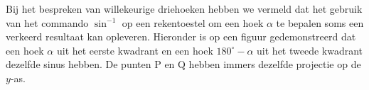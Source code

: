 %
%
%
%
\begin{opmerking}
	 Bij het bespreken van willekeurige driehoeken hebben we vermeld dat het gebruik van het commando $\sin^{-1}$ op een rekentoestel om een hoek $\alpha$ te bepalen soms een verkeerd resultaat kan opleveren. Hieronder is op een figuur gedemonstreerd dat een hoek $\alpha$ uit het eerste kwadrant en een hoek $180^\circ -\alpha$ uit het tweede kwadrant dezelfde sinus hebben. De punten P en Q hebben immers dezelfde projectie op de $y$-as.
\end{opmerking}


